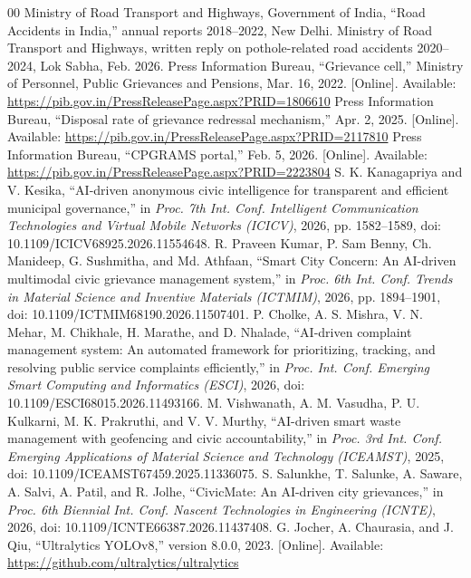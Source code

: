 \documentclass{ieeeaccess}
\begin{document}
\begin{thebibliography}{00}
 Ministry of Road Transport and Highways, Government of India, ``Road Accidents in India,'' annual reports 2018--2022, New Delhi.
 Ministry of Road Transport and Highways, written reply on pothole-related road accidents 2020--2024, Lok Sabha, Feb. 2026.
 Press Information Bureau, ``Grievance cell,'' Ministry of Personnel, Public Grievances and Pensions, Mar. 16, 2022. [Online]. Available: \url{https://pib.gov.in/PressReleasePage.aspx?PRID=1806610}
 Press Information Bureau, ``Disposal rate of grievance redressal mechanism,'' Apr. 2, 2025. [Online]. Available: \url{https://pib.gov.in/PressReleasePage.aspx?PRID=2117810}
 Press Information Bureau, ``CPGRAMS portal,'' Feb. 5, 2026. [Online]. Available: \url{https://pib.gov.in/PressReleasePage.aspx?PRID=2223804}
 S. K. Kanagapriya and V. Kesika, ``AI-driven anonymous civic intelligence for transparent and efficient municipal governance,'' in \textit{Proc. 7th Int. Conf. Intelligent Communication Technologies and Virtual Mobile Networks (ICICV)}, 2026, pp. 1582--1589, doi: 10.1109/ICICV68925.2026.11554648.
 R. Praveen Kumar, P. Sam Benny, Ch. Manideep, G. Sushmitha, and Md. Athfaan, ``Smart City Concern: An AI-driven multimodal civic grievance management system,'' in \textit{Proc. 6th Int. Conf. Trends in Material Science and Inventive Materials (ICTMIM)}, 2026, pp. 1894--1901, doi: 10.1109/ICTMIM68190.2026.11507401.
 P. Cholke, A. S. Mishra, V. N. Mehar, M. Chikhale, H. Marathe, and D. Nhalade, ``AI-driven complaint management system: An automated framework for prioritizing, tracking, and resolving public service complaints efficiently,'' in \textit{Proc. Int. Conf. Emerging Smart Computing and Informatics (ESCI)}, 2026, doi: 10.1109/ESCI68015.2026.11493166.
 M. Vishwanath, A. M. Vasudha, P. U. Kulkarni, M. K. Prakruthi, and V. V. Murthy, ``AI-driven smart waste management with geofencing and civic accountability,'' in \textit{Proc. 3rd Int. Conf. Emerging Applications of Material Science and Technology (ICEAMST)}, 2025, doi: 10.1109/ICEAMST67459.2025.11336075.
 S. Salunkhe, T. Salunke, A. Saware, A. Salvi, A. Patil, and R. Jolhe, ``CivicMate: An AI-driven city grievances,'' in \textit{Proc. 6th Biennial Int. Conf. Nascent Technologies in Engineering (ICNTE)}, 2026, doi: 10.1109/ICNTE66387.2026.11437408.
 G. Jocher, A. Chaurasia, and J. Qiu, ``Ultralytics YOLOv8,'' version 8.0.0, 2023. [Online]. Available: \url{https://github.com/ultralytics/ultralytics}

\end{thebibliography}
\end{document}
